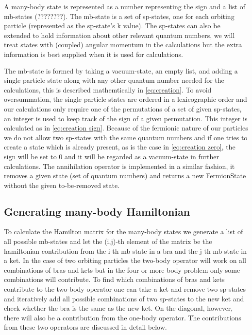 \documentclass[../main/report.tex]{subfiles}
\begin{document}
A many-body state is represented as a number representing the sign and a list of mb-states (????????).
 The mb-state is a set of sp-states, one for each orbiting particle (represented as the sp-state's k value). 
 The sp-states can also be extended to hold information about other relevant quantum numbers, we will treat states with (coupled) angular momentum in the calculations but the extra information is best supplied when it is used for calculations.
 
 
 

The mb-state is formed by taking a vacuum-state, an empty list, and adding a single particle state along with any other quantum number needed for the calculations, this is described mathemtically in \cref{eq:creation}.
To avoid oversummation, the single particle states are ordered in a lexicographic order and our calculations only require one of the permutations of a set of given sp-states, an integer is used to keep track of the sign of a given permutation. 
This integer is calculated as in \cref{eq:creation sign}.
Because of the fermionic nature of our particles we do not allow two sp-states with the same quantum numbers and if one tries to create a state which is already present, as is the case in \cref{eq:creation zero}, the sign will be set to 0 and it will be regarded as a vacuum-state in further calculations.
The annihilation operator is implemented in a similar fashion, it removes a given state (set of quantum numbers) and returns a new FermionState without the given to-be-removed state.
 
 
\subsection{Generating many-body Hamiltonian}
To calculate the Hamilton matrix for the many-body states we generate a list of all possible mb-states and let the (i,j)-th element of the matrix be the hamiltonian contribution from the i-th mb-state in a bra and the j-th mb-state in a ket. 
 In the case of two orbiting particles the two-body operator will work on all combinations of bras and kets but in the four or more body problem only some combinations will contribute.
 To find which combinations of bras and kets contribute to the two-body operator one can take a ket and remove two sp-states and iteratively add all possible combinations of two sp-states to the new ket and check whether the bra is the same as the new ket.
 On the diagonal, however, there will also be a contribution from the one-body operator.
 The contributions from these two operators are discussed in detail below.
\end{document}
